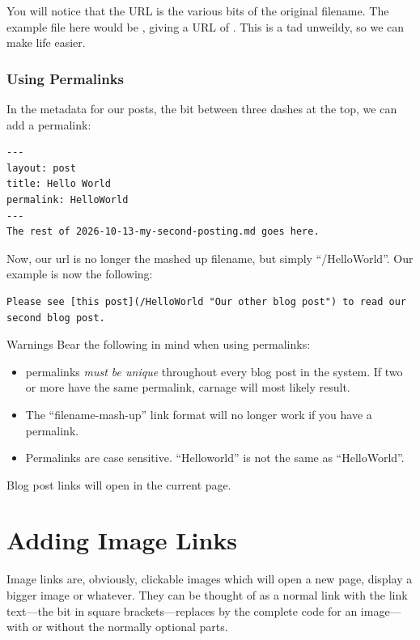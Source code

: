 You will notice that the URL is the various bits of the original filename. The example file here would be , giving a URL of . This is a tad unweildy, so we can make life easier.

\subsubsection{Using Permalinks}

In the metadata for our posts, the bit between three dashes at the top, we can add a permalink:

\begin{lstlisting}[style=myText]
---
layout: post
title: Hello World
permalink: HelloWorld
---
The rest of 2026-10-13-my-second-posting.md goes here.
\end{lstlisting}

Now, our url is no longer the mashed up filename, but simply ``/HelloWorld''. Our example is now the following:

\begin{lstlisting}[style=myText]
Please see [this post](/HelloWorld "Our other blog post") to read our second blog post.
\end{lstlisting}

\begin{tips}{Warnings}
    Bear the following in mind when using permalinks:
    \begin{itemize}
        \item permalinks \emph{must be unique} throughout every blog post in the system. If two or more have the same permalink, carnage will most likely result.
        \item The ``filename-mash-up'' link format will no longer work if you have a permalink.
        \item Permalinks are case sensitive. ``Helloworld'' is not the same as ``HelloWorld''.
    \end{itemize}
\end{tips}

Blog post links will open in the current page.



\section{Adding Image Links}\label{sect: Adding Image Links}

Image links are, obviously, clickable images which will open a new page, display a bigger image or whatever. They can be thought of as a normal link with the link text---the bit in square brackets---replaces by the complete code for an image---with or without the normally optional parts.

